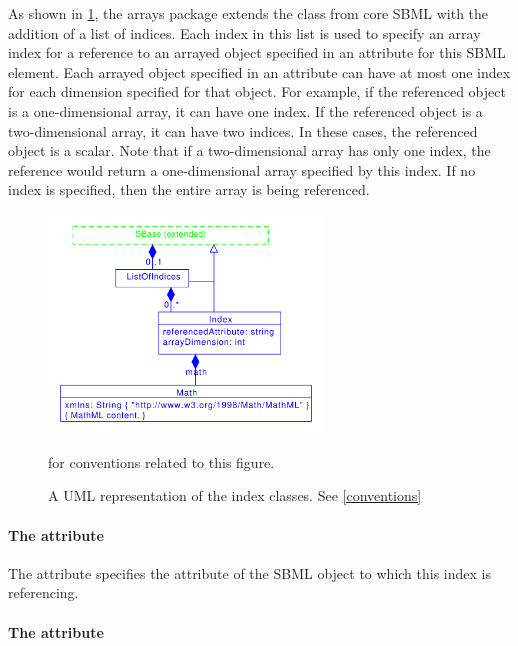As shown in \ref{fig:indices_uml}, the arrays package extends the \SBase class from core SBML with the addition of a list of indices.  Each index in this list is used to specify an array index for a reference to an arrayed object specified in an attribute for this SBML element.    Each arrayed object specified in an attribute can have at most one index for each dimension specified for that object.  
For example, if the referenced object is a one-dimensional array, it can have one index.  If the referenced object is a two-dimensional array, it can have two indices.  In these cases, the referenced object is a scalar.  Note that if a two-dimensional array has only one index, the reference would return a one-dimensional array specified by this index.  If no index is specified, then the entire array is being referenced.  

\begin{figure}[tbhp]
  \centering
  \includegraphics[width=0.65\textwidth]{images/indicesUML.pdf}\\
  \caption{A UML representation of the index classes. See \ref{conventions}} for conventions related to this figure. \label{fig:indices_uml}
\end{figure}

\paragraph{The  attribute}

The  attribute specifies the attribute of the SBML object to which this index is referencing.  

\paragraph{The  attribute}

